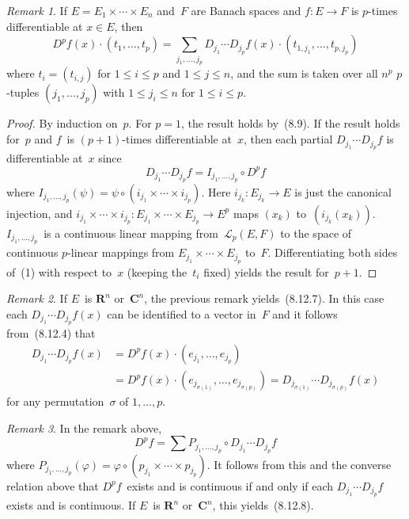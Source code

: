 \documentclass[letterpaper,12pt]{article}
\newcommand{\R}{\mathbf{R}}
\newcommand{\C}{\mathbf{C}}
\renewcommand{\L}{\mathcal{L}}
\newcommand{\after}{\circ}
\newcommand{\at}{\cdot}
\theoremstyle{plain}
\theoremstyle{definition}
\theoremstyle{remark}
\newtheorem*{rmk}{Remark}
\begin{document}
\begin{rmk}
If \(E=E_1\times\cdots\times E_n\) and~\(F\) are Banach spaces and \(f:E\to F\) is \(p\)-times differentiable at \(x\in E\), then
\[D^pf(x)\at(t_1,\ldots,t_p)=\sum_{j_1,\ldots,j_p}D_{j_1}\cdots D_{j_p}f(x)\at(t_{1,j_1},\ldots,t_{p,j_p})\tag{1}\]
where \(t_i=(t_{i,j})\) for \(1\le i\le p\) and \(1\le j\le n\), and the sum is taken over all \(n^p\) \(p\)-tuples \((j_1,\ldots,j_p)\) with \(1\le j_i\le n\) for \(1\le i\le p\).
\end{rmk}
\begin{proof}
By induction on~\(p\). For \(p=1\), the result holds by~(8.9). If the result holds for~\(p\) and \(f\)~is \((p+1)\)-times differentiable at~\(x\), then each partial \(D_{j_1}\cdots D_{j_p}f\) is differentiable at~\(x\) since
\[D_{j_1}\cdots D_{j_p}f=I_{j_1,\ldots,j_p}\after D^pf\]
where \(I_{j_1,\ldots,j_p}(\psi)=\psi\after(i_{j_1}\times\cdots\times i_{j_p})\). Here \(i_{j_k}:E_{j_k}\to E\) is just the canonical injection, and \(i_{j_1}\times\cdots\times i_{j_p}:E_{j_1}\times\cdots\times E_{j_p}\to E^p\) maps \((x_k)\) to~\((i_{j_k}(x_k))\). \(I_{j_1,\ldots,j_p}\)~is a continuous linear mapping from~\(\L_p(E,F)\) to the space of continuous \(p\)-linear mappings from \(E_{j_1}\times\cdots\times E_{j_p}\) to~\(F\). Differentiating both sides of~(1) with respect to~\(x\) (keeping the~\(t_i\) fixed) yields the result for~\(p+1\).
\end{proof}

\begin{rmk}
If \(E\)~is \(\R^n\) or~\(\C^n\), the previous remark yields~(8.12.7). In this case each \(D_{j_1}\cdots D_{j_p}f(x)\) can be identified to a vector in~\(F\) and it follows from~(8.12.4) that
\begin{align*}
D_{j_1}\cdots D_{j_p}f(x)&=D^pf(x)\at(e_{j_1},\ldots,e_{j_p})\\
	&=D^pf(x)\at(e_{j_{\sigma(1)}},\ldots,e_{j_{\sigma(p)}})=D_{j_{\sigma(1)}}\cdots D_{j_{\sigma(p)}}f(x)
\end{align*}
for any permutation~\(\sigma\) of \(1,\ldots,p\).
\end{rmk}

\begin{rmk}
In the remark above,
\[D^pf=\sum P_{j_1,\ldots,j_p}\after D_{j_1}\cdots D_{j_p}f\]
where \(P_{j_1,\ldots,j_p}(\varphi)=\varphi\after(p_{j_1}\times\cdots\times p_{j_p})\). It follows from this and the converse relation above that \(D^pf\)~exists and is continuous if and only if each \(D_{j_1}\cdots D_{j_p}f\) exists and is continuous. If \(E\)~is \(\R^n\) or~\(\C^n\), this yields~(8.12.8).
\end{rmk}
\end{document}
